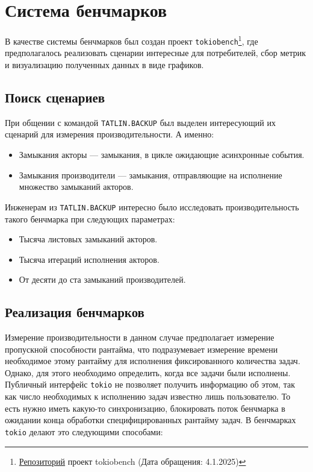 
\section{Система бенчмарков}

В качестве системы бенчмарков был создан проект \verb|tokiobench|\footnote{\href{https://github.com/IgorErin/tokiobench}{Репозиторий} проект tokiobench (Дата обращения: 4.1.2025)}, где предполагалось реализовать сценарии интересные для потребителей, сбор метрик и визуализацию полученных данных в виде графиков.

\subsection{Поиск сценариев}

При общении с командой \verb|TATLIN.BACKUP| был выделен интересующий их сценарий для измерения производительности. А именно:

\begin{itemize}
    \item Замыкания акторы --- замыкания, в цикле ожидающие асинхронные события.
    \item Замыкания производители --- замыкания, отправляющие на исполнение множество замыканий акторов.
\end{itemize}

Инженерам из \verb|TATLIN.BACKUP| интересно было исследовать производительность такого бенчмарка при следующих параметрах:

\begin{itemize}
    \item Тысяча листовых замыканий акторов.
    \item Тысяча итераций исполнения акторов.
    \item От десяти до ста замыканий производителей.
\end{itemize}

\subsection{Реализация бенчмарков}

Измерение производительности в данном случае предполагает измерение пропускной способности рантайма, что подразумевает измерение времени необходимое этому рантайму для исполнения фиксированного количества задач. Однако, для этого необходимо определить, когда все задачи были исполнены. Публичный интерфейс \verb|tokio| не позволяет получить информацию об этом, так как число необходимых к исполнению задач известно лишь пользователю. То есть нужно иметь какую-то синхронизацию, блокировать поток бенчмарка в ожидании конца обработки специфицированных рантайму задач. В бенчмарках \verb|tokio| делают это следующими способами:

